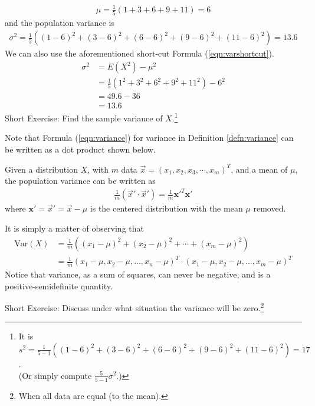 \begin{align*}
\mu = \frac{1}{5}(1 + 3 + 6 + 9 + 11) = 6
\end{align*}
and the population variance is
\begin{align*}
\sigma^2 = \frac{1}{5}((1-6)^2 + (3-6)^2 + (6-6)^2 + (9-6)^2 + (11-6)^2) = 13.6
\end{align*}
We can also use the aforementioned short-cut Formula (\ref{eqn:varshortcut}).
\begin{align*}
\sigma^2 &= E(X^2) - \mu^2 \\
&= \frac{1}{5} (1^2 + 3^2 + 6^2 + 9^2 + 11^2) - 6^2 \\
&= 49.6 - 36 \\
&= 13.6
\end{align*}
Short Exercise: Find the sample variance of $X$.\footnote{It is $s^2 = \frac{1}{5-1}((1-6)^2 + (3-6)^2 + (6-6)^2 + (9-6)^2 + (11-6)^2) = 17$.\\(Or simply compute $\frac{5}{5-1}\sigma^2$.)} \par
Note that Formula (\ref{eqn:variance}) for variance in Definition \ref{defn:variance} can be written as a dot product shown below.
\begin{proper}
Given a distribution $X$, with $m$ data $\vec{x} = (x_1, x_2, x_3, \cdots, x_m)^T$, and a mean of $\mu$, the population variance can be written as
\begin{align}
\frac{1}{m} (\vec{x}'\cdot\vec{x}') = \frac{1}{m} \textbf{x}'^T \textbf{x}'
\end{align}
where $\textbf{x}' = \vec{x}' = \vec{x} - \mu$ is the centered distribution with the mean $\mu$ removed.
\end{proper}
It is simply a matter of observing that 
\begin{align*}
\text{Var}(X) &= \frac{1}{m} ((x_1 - \mu)^2 + (x_2 - \mu)^2 + \cdots + (x_m - \mu)^2) \\ &= \frac{1}{m} (x_1 - \mu, x_2 - \mu, \ldots, x_n - \mu)^T \cdot (x_1 - \mu, x_2 - \mu, \ldots, x_m - \mu)^T    
\end{align*}
Notice that variance, as a sum of squares, can never be negative, and is a positive-semidefinite quantity. \par
Short Exercise: Discuss under what situation the variance will be zero.\footnote{When all data are equal (to the mean).}

